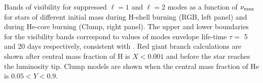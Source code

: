 \label{fig:visibility} Bands of visibility for suppressed $\ell=1$ and $\ell=2$ modes as a function of $\nu_{\rm max}$ for stars of different initial mass during H-shell burning (RGB, left panel) and during He-core burning (Clump, right panel). The upper and lower boundaries for the visibility bands correspond to values of modes envelope life-time $\tau=$ 5 and 20 days respectively, consistent with \cite{Dupret_2009,Corsaro_2015}. Red giant branch calculations are shown after central mass fraction of H is $ X < 0.001$ and before the star reaches the luminosity tip. Clump models are shown when the central mass fraction of He is $0.05 < Y < 0.9$.

  
  
  
  
